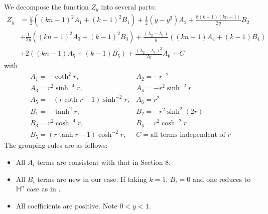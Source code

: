 \documentclass{amsart}
\numberwithin{equation}{section}
\theoremstyle{plain}
\theoremstyle{definition}
\theoremstyle{remark}
\def\HH {\mathbb{H}}
\begin{document}
\par We decompose the function $Z_y$ into several parts:
\begin{equation}
    \begin{aligned}
        Z_y& =\frac{y}{2}((kn-1)^2 A_1+(k-1)^2 B_1)+\frac{1}{2}\left(y-y^3\right)A_2+\frac{8(k-1)(k n-1)}{2y}B_2 \\
        &+\frac{1}{2y}((kn-1)^2 A_3+(k-1)^2 B_3)+\frac{(\lambda_2-\lambda_1)}{y}((kn-1)A_4+(k-1)B_4)\\
        &+2((kn-1)A_5+(k-1)B_5)+\frac{(\lambda_2-\lambda_1)^2}{2y}A_6+ C 
    \end{aligned}
\end{equation}
with
\begin{equation}
\begin{array}{ll}
A_1=-\operatorname{coth}^2 r, & A_2=-r^{-2} \\
A_3= r^2 \sinh ^{-4} r, & A_4=-r^2 \sinh ^{-2} r \\
A_5=-(r \operatorname{coth} r-1) \sinh ^{-2} r, & A_6= r^2\\
B_1=-\tanh^2{r}, & B_2=-r^2 \sinh ^2(2 r) \\
B_3=  r^2\cosh ^{-4} r,& B_4=r^2\cosh^{-2}{r}\\
B_5= (r \tanh r-1) \cosh ^{-2} r, & C= \text{all terms independent of } r
\end{array}
\end{equation}
The grouping rules are as follows:
\begin{itemize}
    \item All $A_i$ terms are consistent with that in \cite{benguria2007second} Section 8.
    \item All $B_i$ terms are new in our case. If taking $k=1$, $B_i= 0$ and one reduces to $\HH^n$ case as in \cite{benguria2007second}.
    \item All coefficients are positive. Note $0<y<1$.
\end{itemize}
\end{document}
